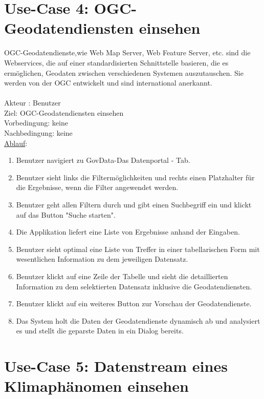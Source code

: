 \documentclass[a4paper,12pt]{scrreprt}
\begin{document}
	\section*{\small \textbf{Use-Case 4: OGC-Geodatendiensten einsehen}}
	OGC-Geodatendienste,wie Web Map Server, Web Feature Server, etc. sind die Webservices, die auf einer standardisierten Schnittstelle basieren, die es ermöglichen, Geodaten zwischen verschiedenen Systemen auszutauschen. Sie werden von der OGC entwickelt und sind international anerkannt.\\\\
	Akteur : Benutzer\\
	Ziel:  OGC-Geodatendiensten einsehen\\
	Vorbedingung: keine\\
	Nachbedingung: keine\\
	\underline{Ablauf}:
	\begin{enumerate}
		\item Benutzer navigiert zu GovData-Das Datenportal - Tab.
		\item Benutzer sieht links die Filtermöglichkeiten und rechts einen Platzhalter für die Ergebnisse, wenn die Filter angewendet werden.
		\item Benutzer geht allen Filtern durch und gibt einen Suchbegriff ein und klickt auf das Button "Suche starten".
		\item Die Applikation liefert eine Liste von Ergebnisse anhand der Eingaben.
		\item Benutzer sieht optimal eine Liste von Treffer in einer tabellarischen Form mit wesentlichen Information zu dem jeweiligen Datensatz.
		\item Benutzer klickt auf eine Zeile der Tabelle und sieht die detaillierten Information zu dem selektierten Datensatz inklusive die Geodatendiensten.
		\item Benutzer klickt auf ein weiteres Button zur Vorschau der Geodatendienste.
		\item Das System holt die Daten der Geodatendienste dynamisch ab und analysiert es und stellt die geparste Daten in ein Dialog bereits. 	
	\end{enumerate}
	\section*{\small \textbf{Use-Case 5: Datenstream eines Klimaphänomen einsehen}}
	
\end{document}
